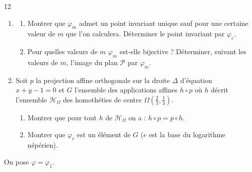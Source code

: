 \documentclass{axiobac}
\begin{document}
\begin{probleme}{12}
\begin{enumerate}
    \item
    \begin{enumerate}
        \item Montrer que $\varphi_m$ admet un point invariant unique sauf pour une certaine valeur de $m$ que l'on calculera. Déterminer le point invariant par $\varphi_e$.
        \item Pour quelles valeurs de $m$ $\varphi_m$ est-elle bijective ? Déterminer, suivant les valeurs de $m$, l'image du plan $\mathcal{P}$ par $\varphi_m$.
    \end{enumerate}
    \item Soit $p$ la projection affine orthogonale sur la droite $\Delta$ d'équation $x + y - 1 = 0$ et $G$ l'ensemble des applications affines $h \circ p$ où $h$ décrit l'ensemble $\mathcal{H}_\Omega$ des homothéties de centre $\Omega\left(\frac{2}{3}, \frac{1}{3}\right)$.
    \begin{enumerate}
        \item Montrer que pour tout $h$ de $\mathcal{H}_\Omega$ on a : $h \circ p = p \circ h$.
        \item Montrer que $\varphi_e$ est un élément de $G$ ($e$ est la base du logarithme népérien).
    \end{enumerate}
\end{enumerate}

\horsprogramme

On pose $\varphi = \varphi_1$.


\end{probleme}
\end{document}
